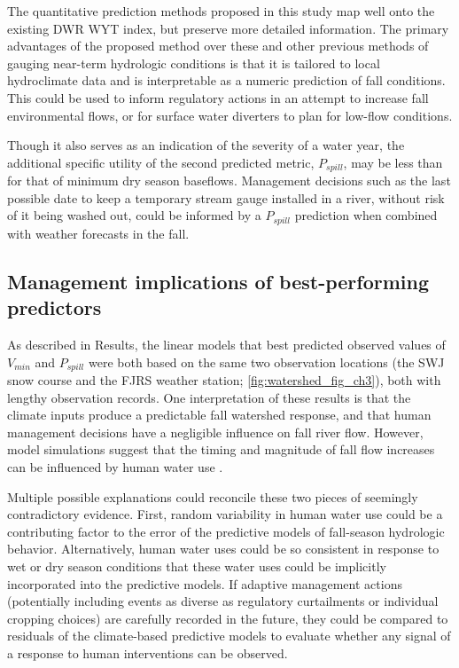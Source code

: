 \documentclass[hess, manuscript]{copernicus}
\begin{document}
The quantitative prediction methods proposed in this study map well onto
the existing DWR WYT index, but preserve more detailed information. The
primary advantages of the proposed method over these and other previous
methods of gauging near-term hydrologic conditions is that it is
tailored to local hydroclimate data and is interpretable as a numeric
prediction of fall conditions. This could be used to inform regulatory
actions in an attempt to increase fall environmental flows, or for
surface water diverters to plan for low-flow conditions.

Though it also serves as an indication of the severity of a water year,
the additional specific utility of the second predicted metric,
\(P_{spill}\), may be less than for that of minimum dry season
baseflows. Management decisions such as the last possible date to keep a
temporary stream gauge installed in a river, without risk of it being
washed out, could be informed by a \(P_{spill}\) prediction when
combined with weather forecasts in the fall.

\subsection{Management implications of best-performing predictors}

As described in Results, the linear models that best predicted observed
values of \(V_{min}\) and \(P_{spill}\) were both based on the same two
observation locations (the SWJ snow course and the FJRS weather station;
\autoref{fig:watershed_fig_ch3}), both with lengthy observation records.
One interpretation of these results is that the climate inputs produce a
predictable fall watershed response, and that human management decisions
have a negligible influence on fall river flow. However, model
simulations suggest that the timing and magnitude of fall flow increases
can be influenced by human water use \citeyearpar[e.g., scenarios in
Siskiyou County][]{SiskiyouCounty2021}.

Multiple possible explanations could reconcile these two pieces of
seemingly contradictory evidence. First, random variability in human
water use could be a contributing factor to the error of the predictive
models of fall-season hydrologic behavior. Alternatively, human water
uses could be so consistent in response to wet or dry season conditions
that these water uses could be implicitly incorporated into the
predictive models. If adaptive management actions (potentially including
events as diverse as regulatory curtailments or individual cropping
choices) are carefully recorded in the future, they could be compared to
residuals of the climate-based predictive models to evaluate whether any
signal of a response to human interventions can be observed.
\end{document}
